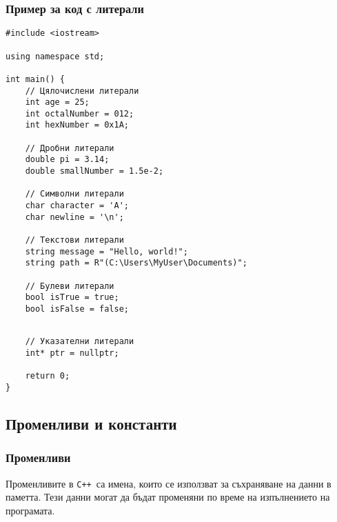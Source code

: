 \documentclass[oneside]{book}
\newcommand*{\cpp}{\texttt{C++}\ }
\begin{document}
\subsubsection{Пример за код с литерали}
\begin{mdframed}\begin{lstlisting}
#include <iostream>

using namespace std;

int main() {
    // Цялочислени литерали
    int age = 25;
    int octalNumber = 012;
    int hexNumber = 0x1A;

    // Дробни литерали
    double pi = 3.14;
    double smallNumber = 1.5e-2;

    // Символни литерали
    char character = 'A';
    char newline = '\n';

    // Текстови литерали
    string message = "Hello, world!";
    string path = R"(C:\Users\MyUser\Documents)";

    // Булеви литерали
    bool isTrue = true;
    bool isFalse = false;
\end{lstlisting}\end{mdframed}
\begin{mdframed}\begin{lstlisting}[firstnumber=26]

    // Указателни литерали
    int* ptr = nullptr;

    return 0;
}
\end{lstlisting}\end{mdframed}

\subsection{Променливи и константи}
\subsubsection{Променливи}
Променливите в \cpp са имена, които се използват за съхраняване на данни в паметта. Тези данни могат да бъдат променяни по време на изпълнението на програмата.
\end{document}
